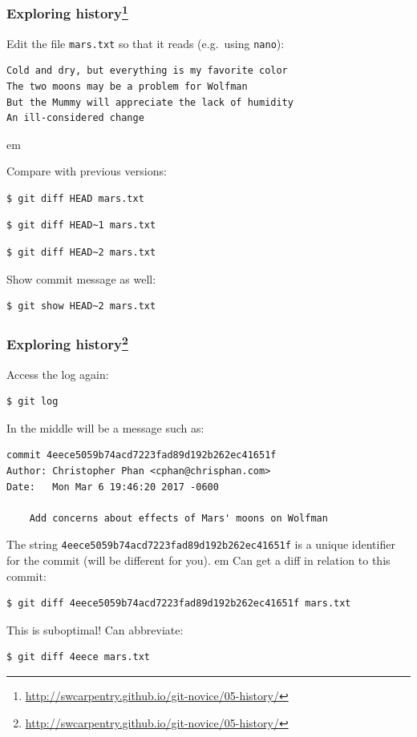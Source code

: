 \documentclass{beamer}
\begin{document}
\begin{frame}[fragile]
\frametitle{Exploring history\footnote{\url{http://swcarpentry.github.io/git-novice/05-history/}}}

Edit the file \texttt{mars.txt} so that it reads (e.g.~using \texttt{nano}):
\begin{verbatim}
Cold and dry, but everything is my favorite color
The two moons may be a problem for Wolfman
But the Mummy will appreciate the lack of humidity
An ill-considered change
\end{verbatim}

\pause
{} em

Compare with previous versions:
\begin{verbatim}
$ git diff HEAD mars.txt
\end{verbatim}
\pause
\begin{verbatim}
$ git diff HEAD~1 mars.txt
\end{verbatim}
\pause
\begin{verbatim}
$ git diff HEAD~2 mars.txt
\end{verbatim}
\pause

Show commit message as well:
\begin{verbatim}
$ git show HEAD~2 mars.txt
\end{verbatim}

\end{frame}

\begin{frame}[fragile]
\frametitle{Exploring history\footnote{\url{http://swcarpentry.github.io/git-novice/05-history/}}}

Access the log again:
\begin{verbatim}
$ git log
\end{verbatim}
\pause

In the middle will be a message such as:
\begin{verbatim}
commit 4eece5059b74acd7223fad89d192b262ec41651f
Author: Christopher Phan <cphan@chrisphan.com>
Date:   Mon Mar 6 19:46:20 2017 -0600

    Add concerns about effects of Mars' moons on Wolfman
\end{verbatim}

The string \texttt{4eece5059b74acd7223fad89d192b262ec41651f} is a unique identifier for the commit (will be different for you).
\pause
{} em
Can get a diff in relation to this commit:
\begin{verbatim}
$ git diff 4eece5059b74acd7223fad89d192b262ec41651f mars.txt
\end{verbatim}
\pause
\textcolor{red!50!black}{This is suboptimal!} \pause Can abbreviate:
\begin{verbatim}
$ git diff 4eece mars.txt
\end{verbatim}

\end{frame}
\end{document}
